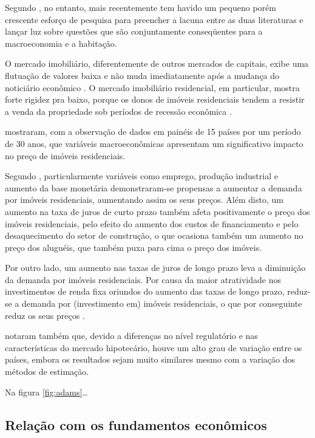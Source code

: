 \documentclass[
	12pt,				%
	oneside,			%
	a4paper,			%
	chapter=TITLE,		%
	section=TITLE,		%
	english,			%
	brazil				%
	]{abntex2}
\begin{document}
Segundo \textcite[p.~4]{LEUNG}, no entanto, mais recentemente tem havido
um pequeno porém crescente esforço de pesquisa para preencher a lacuna
entre as duas literaturas e lançar luz sobre questões que são
conjuntamente conseqüentes para a macroeconomia e a habitação.

O mercado imobiliário, diferentemente de outros mercados de capitais,
exibe uma flutuação de valores baixa e não muda imediatamente após a
mudança do noticiário econômico \autocite[3]{ADAMS201038}. O mercado
imobiliário residencial, em particular, mostra forte rigidez pra baixo,
porque os donos de imóveis residenciais tendem a resistir a venda da
propriedade sob períodos de recessão econômica \autocite[129]{Case2000}.

\textcite{ADAMS201038} mostraram, com a observação de dados em painéis
de 15 países por um período de 30 anos, que variáveis macroeconômicas
apresentam um significativo impacto no preço de imóveis residenciais.

Segundo \textcite[p.~18]{ADAMS201038}, particularmente variáveis como
emprego, produção industrial e aumento da base monetária demonstraram-se
propensas a aumentar a demanda por imóveis residenciais, aumentando
assim os seus preços. Além disto, um aumento na taxa de juros de curto
prazo também afeta positivamente o preço dos imóveis residenciais, pelo
efeito do aumento dos custos de financiamento e pelo desaquecimento do
setor de construção, o que ocasiona também um aumento no preço dos
aluguéis, que também puxa para cima o preço dos imóveis.

Por outro lado, um aumento nas taxas de juros de longo prazo leva a
diminuição da demanda por imóveis residenciais. Por causa da maior
atratividade nos investimentos de renda fixa oriundos do aumento das
taxas de longo prazo, reduz-se a demanda por (investimento em) imóveis
residenciais, o que por conseguinte reduz os seus preços
\autocite[19]{ADAMS201038}.

\textcite{ADAMS201038} notaram também que, devido a diferenças no nível
regulatório e nas características do mercado hipotecário, houve um alto
grau de variação entre os países, embora os resultados sejam muito
similares mesmo com a variação dos métodos de estimação.

Na figura \ref{fig:adams}\ldots{}

\subsection{Relação com os fundamentos
econômicos}\label{relauxe7uxe3o-com-os-fundamentos-econuxf4micos}
\end{document}

